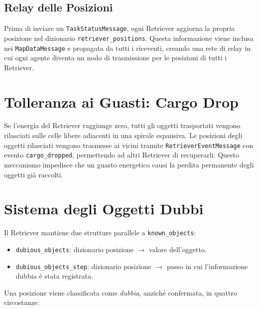 \subsection{Relay delle Posizioni}

Prima di inviare un \texttt{TaskStatusMessage}, ogni Retriever aggiorna la propria
posizione nel dizionario \texttt{retriever\_positions}. Questa informazione viene
inclusa nei \texttt{MapDataMessage} e propagata da tutti i riceventi, creando una
rete di relay in cui ogni agente diventa un nodo di trasmissione per le posizioni
di tutti i Retriever.

\section{Tolleranza ai Guasti: Cargo Drop}

Se l'energia del Retriever raggiunge zero, tutti gli oggetti trasportati vengono
rilasciati sulle celle libere adiacenti in una spirale espansiva. Le posizioni
degli oggetti rilasciati vengono trasmesse ai vicini tramite
\texttt{RetrieverEventMessage} con evento \texttt{cargo\_dropped}, permettendo
ad altri Retriever di recuperarli. Questo meccanismo impedisce che un guasto
energetico causi la perdita permanente degli oggetti gi\`a raccolti.

\section{Sistema degli Oggetti Dubbi}
\label{sec:dubious}

Il Retriever mantiene due strutture parallele a \texttt{known\_objects}:

\begin{itemize}
    \item \texttt{dubious\_objects}: dizionario posizione $\to$ valore dell'oggetto.
    \item \texttt{dubious\_objects\_step}: dizionario posizione $\to$ passo in cui
          l'informazione dubbia \`e stata registrata.
\end{itemize}

Una posizione viene classificata come \textit{dubbia}, anziché confermata, in
quattro circostanze:

